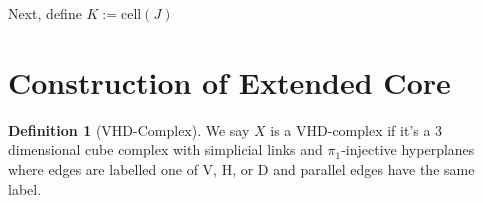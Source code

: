 \documentclass[12pt,parskip=full]{report}
\theoremstyle{plain}
\theoremstyle{definition}
\newtheorem{dfn}[thm]{Definition}
\begin{document}
        
        
        
        
        
        
        
        
        
        
        
        Next, define \(K := \text{cell}(J)\) 

\section{Construction of Extended Core}

\begin{dfn}
    [VHD-Complex]
    We say \(X\) is a VHD-complex if it's a 3 dimensional cube complex with simplicial links and \(\pi_1\)-injective hyperplanes where edges are labelled one of V, H, or D and parallel edges have the same label.
\end{dfn}
\end{document}
